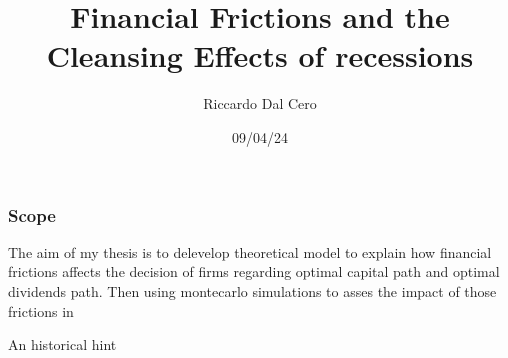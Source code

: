 \documentclass{beamer}
\title{Financial Frictions and the Cleansing Effects of recessions}
\author{Riccardo Dal Cero}
\date{09/04/24}
\begin{document}
\frame{\titlepage}
\begin{frame}
    \frametitle{Scope}
    The aim of my thesis is to delevelop theoretical model to explain how financial frictions affects the decision
    of firms regarding optimal capital path and optimal dividends path. Then using montecarlo simulations to asses the
    impact of those frictions in
\end{frame}
\begin{frame}{An historical hint}
    
\end{frame}
\end{document}
